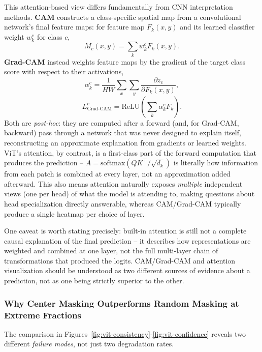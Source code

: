 This attention-based view differs fundamentally from CNN interpretation
methods. \textbf{CAM} constructs a class-specific spatial map from a
convolutional network's final feature maps: for feature map $F_k(x,y)$ and
its learned classifier weight $w_k^c$ for class $c$,
\[
  M_c(x,y) = \sum_k w_k^c F_k(x,y).
\]
\textbf{Grad-CAM} instead weights feature maps by the gradient of the
target class score with respect to their activations,
\[
  \alpha_k^c = \frac{1}{HW}\sum_{x}\sum_{y}\frac{\partial z_c}{\partial F_k(x,y)},
\]
\[
  L^c_{\text{Grad-CAM}} = \mathrm{ReLU}\!\left(\sum_k \alpha_k^c F_k\right).
\]
Both are \emph{post-hoc}: they are computed after a forward (and, for
Grad-CAM, backward) pass through a network that was never designed to
explain itself, reconstructing an approximate explanation from gradients
or learned weights. ViT's attention, by contrast, is a first-class part of
the forward computation that produces the prediction --
$A=\mathrm{softmax}(QK^\top/\sqrt{d_k})$ is literally how information from
each patch is combined at every layer, not an approximation added
afterward. This also means attention naturally exposes \emph{multiple}
independent views (one per head) of what the model is attending to, making
questions about head specialization directly answerable, whereas
CAM/Grad-CAM typically produce a single heatmap per choice of layer.

One caveat is worth stating precisely: built-in attention is still not a
complete causal explanation of the final prediction -- it describes how
representations are weighted and combined at one layer, not the full
multi-layer chain of transformations that produced the logits. CAM/Grad-CAM
and attention visualization should be understood as two different sources
of evidence about a prediction, not as one being strictly superior to the
other.

\subsubsection{Why Center Masking Outperforms Random Masking at Extreme Fractions}

The comparison in Figures~\ref{fig:vit-consistency}-\ref{fig:vit-confidence}
reveals two different \emph{failure modes}, not just two degradation rates.

